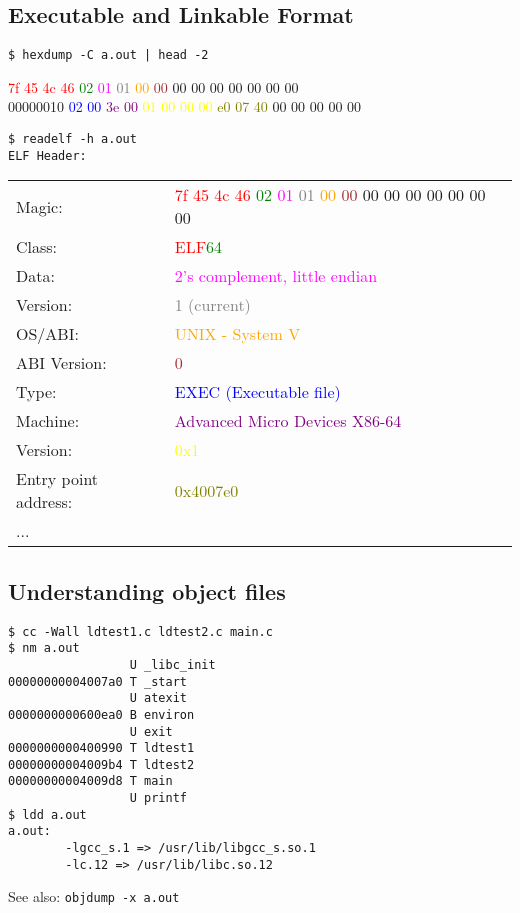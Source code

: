 \documentclass[xga]{xdvislides}
\begin{document}
\subsection{Executable and Linkable Format}
\begin{verbatim}
$ hexdump -C a.out | head -2
\end{verbatim}
  \textcolor{red}{7f 45 4c 46} \textcolor{green}{02} \textcolor{magenta}{01} \textcolor{gray}{01} \textcolor{orange}{00} \textcolor{brown}{00} 00 00 00 00 00 00 00 \\
00000010  \textcolor{blue}{02 00} \textcolor{purple}{3e 00} \textcolor{yellow}{01 00 00 00}  \textcolor{olive}{e0 07 40} 00 00 00 00 00
\begin{verbatim}
$ readelf -h a.out
ELF Header:
\end{verbatim}
\begin{tabular}{ll}
  Magic: & \textcolor{red}{7f 45 4c 46} \textcolor{green}{02} \textcolor{magenta}{01} \textcolor{gray}{01} \textcolor{orange}{00} \textcolor{brown}{00} 00 00 00 00 00 00 00 \\
  Class: & \textcolor{red}{ELF}\textcolor{green}{64} \\
  Data: & \textcolor{magenta}{2's complement, little endian} \\
  Version: & \textcolor{gray}{1 (current)} \\
  OS/ABI: & \textcolor{orange}{UNIX - System V} \\
  ABI Version: & \textcolor{brown}{0} \\
  Type: & \textcolor{blue}{EXEC (Executable file)} \\
  Machine: & \textcolor{purple}{Advanced Micro Devices X86-64} \\
  Version: & \textcolor{yellow}{0x1} \\
  Entry point address: & \textcolor{olive}{0x4007e0} \\
  ... \\
\end{tabular}
\setfontphv

\subsection{Understanding object files}
\begin{verbatim}
$ cc -Wall ldtest1.c ldtest2.c main.c
$ nm a.out
                 U _libc_init
00000000004007a0 T _start
                 U atexit
0000000000600ea0 B environ
                 U exit
0000000000400990 T ldtest1
00000000004009b4 T ldtest2
00000000004009d8 T main
                 U printf
$ ldd a.out
a.out:
        -lgcc_s.1 => /usr/lib/libgcc_s.so.1
        -lc.12 => /usr/lib/libc.so.12
\end{verbatim}
See also: \verb+objdump -x a.out+
\end{document}

